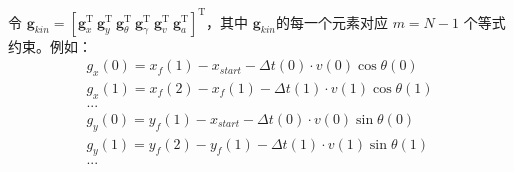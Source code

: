 \documentclass[master,academic]{ysuthesis} %
\begin{document}
		令 $\bm{g}_{kin} = [\bm{g}_x^{\mathrm{T}}\ \bm{g}_y^{\mathrm{T}}\ \bm{g}_\theta^{\mathrm{T}}\ \bm{g}_\gamma^{\mathrm{T}}\ \bm{g}_v^{\mathrm{T}}\ \bm{g}_a^{\mathrm{T}}]^{\mathrm{T}}$，其中 $\bm{g}_{kin}$的每一个元素对应 $m = N-1$ 个等式约束。例如：
		\begin{equation}
			\begin{aligned}
				g_{x}( 0 ) =x_f( 1 ) -x_{start}-\Delta t( 0 ) \cdot v( 0 ) \cos \theta( 0 ) \\
				g_{x}( 1 ) =x_f( 2 ) -x_f( 1 ) -\Delta t( 1 ) \cdot v( 1 ) \cos \theta ( 1 ) \\
				...\\
				g_{y}( 0 ) =y_f( 1 ) -x_{start}-\Delta t( 0 ) \cdot v( 0 ) \sin \theta ( 0 ) \\
				g_{y}( 1 ) =y_f( 2 ) -y_f( 1 ) -\Delta t( 1 ) \cdot v( 1 ) \sin \theta ( 1 ) \\
				...
			\end{aligned}   
		\end{equation}
\end{document}
